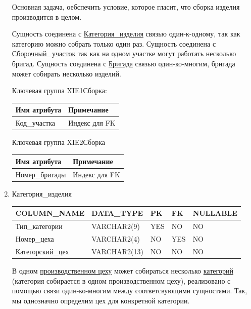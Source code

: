\begin{enumerate}
    Основная задача, оебспечить условие, которое гласит, что сборка изделия производится в целом.

    Сущность соединена с \underline{Категория\_изделия} связью один-к-одному, так как категорию можно собрать только один раз.
    Сущность соединена с \underline{Сборочный\_участок} так как на одном участке могут работать несколько бригад.
    Сущность соединена с \underline{Бригада} связью один-ко-многим, бригада может собирать несколько изделий.

    Ключевая группа XIE1Сборка:

    \begin{tabular}{|p{7cm}|p{9.3cm}|} \hline

        {\bf Имя атрибута} & {\bf Примечание} \\ \hline
        Код\_участка & Индекс для FK \\ \hline

    \end{tabular}

    Ключевая группа XIE2Сборка

    \begin{tabular}{|p{7cm}|p{9.3cm}|} \hline

        {\bf Имя атрибута} & {\bf Примечание} \\ \hline
        Номер\_бригады & Индекс для FK \\ \hline

    \end{tabular}

    \item{Категория\_изделия}

    \begin{tabular}{|p{7cm}|p{3cm}|p{1cm}|p{1cm}|p{3cm}|} \hline

        {\bf COLUMN\_NAME} & {\bf DATA\_TYPE} & {\bf PK} & {\bf FK} & {\bf NULLABLE} \\ \hline
        Тип\_категории & VARCHAR2(9) & YES & NO & NO \\ \hline
        Номер\_цеха & VARCHAR2(4) & NO & YES & NO \\ \hline
        Категорский\_цех & VARCHAR2(13) & NO & NO & NO \\ \hline

    \end{tabular}

    В одном \underline{производственном цеху} может собираться несколько \underline{категорий} (категория собирается в одном производственном цеху), реализовано с помощью связи один-ко-многим между соответсвующими сущностями.
    Так, мы однозначно определим цех для конкретной категории.


\end{enumerate}
